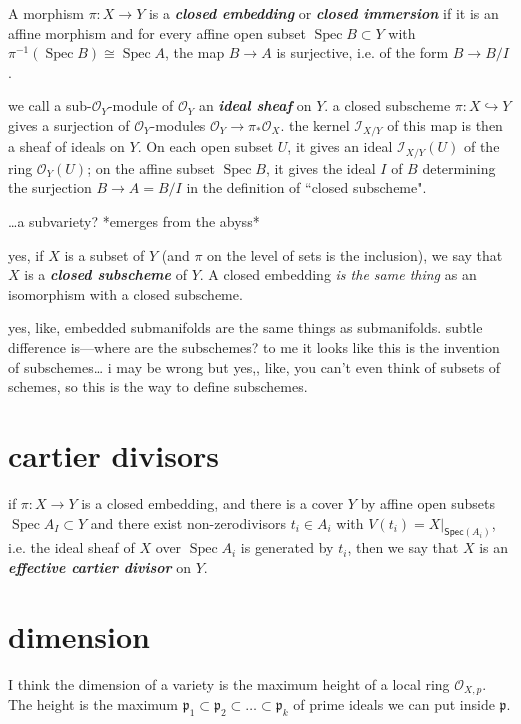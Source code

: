 A morphism \(\pi:X \to Y\) is a \textit{\textbf{closed embedding}} or \textit{\textbf{closed immersion}} if it is an affine morphism and for every affine open subset \(\operatorname{Spec}B \subset Y\) with \(\pi^{-1}(\operatorname{Spec}B)\cong \operatorname{Spec} A\), the map \(B \to A\) is surjective, i.e. of the form \(B \to B/I\).

we call a sub-\(\mathcal{O}_Y\)-module of \(\mathcal{O}_Y\) an \textit{\textbf{ideal sheaf}} on \(Y\). a closed subscheme \(\pi:X \hookrightarrow  Y\) gives a surjection of \(\mathcal{O}_Y\)-modules \(\mathcal{O}_Y \to \pi_* \mathcal{O}_X\). the kernel \(\mathcal{I}_{X/Y}\) of this map is then a sheaf of ideals on \(Y\). On each open subset \(U\), it gives an ideal \(\mathcal{I}_{X/Y}(U)\) of the ring  \(\mathcal{O}_Y(U)\); on the affine subset \(\operatorname{Spec}B\), it gives the ideal \(I\) of \(B\) determining the surjection \(B \to A=B/I\) in the definition of ``closed subscheme".

…a subvariety? *emerges from the abyss*

yes, if \(X\) is a subset of \(Y\) (and \(\pi\) on the level of sets is the inclusion), we say that \(X\) is a \textit{\textbf{closed subscheme}} of \(Y\). A closed embedding \textit{is the same thing} as an isomorphism with a closed subscheme.

yes, like, embedded submanifolds are the same things as submanifolds. subtle difference is---where are the subschemes? to me it looks like this is the invention of subschemes… i may be wrong but yes,, like, you can't even think of subsets of schemes, so this is the way to define subschemes.

\section{cartier divisors}

if \(\pi:X \to Y\) is a closed embedding, and there is a cover \(Y\) by affine open subsets \(\operatorname{Spec}A_I \subset Y\) and there exist non-zerodivisors \(t_i \in A_i\) with \(V(t_i)=X|_{\mathsf{Spec}(A_i)}\), i.e. the ideal sheaf of \(X\) over \(\operatorname{Spec}A_i\) is generated by \(t_i\), then we say that \(X\) is an \textit{\textbf{effective cartier divisor}} on \(Y\).

\section{dimension}

I think the dimension of a variety is the maximum height of a local ring \(\mathcal{O}_{X,p}\). The height is the maximum \(\mathfrak{p}_1 \subset \mathfrak{p}_2 \subset\ldots \subset\mathfrak{p}_k\) of prime ideals we can put inside \(\mathfrak{p}\).

